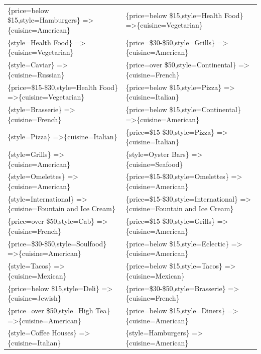 \documentclass[letterpaper,10pt]{article}
\begin{document}
\begin{appendices}
\begin{table}[h]
\begin{adjustbox}{max width=\textwidth}
\begin{tabular}{ll}
\{price=below \$15,style=Hamburgers\} =\textgreater \{cuisine=American\} & \{price=below \$15,style=Health Food\} =\textgreater \{cuisine=Vegetarian\} \\ 
\{style=Health Food\} =\textgreater \{cuisine=Vegetarian\} & \{price=\$30-\$50,style=Grills\} =\textgreater \{cuisine=American\} \\ 
\{style=Caviar\} =\textgreater \{cuisine=Russian\} & \{price=over \$50,style=Continental\} =\textgreater \{cuisine=French\} \\ 
\{price=\$15-\$30,style=Health Food\} =\textgreater \{cuisine=Vegetarian\} & \{price=below \$15,style=Pizza\} =\textgreater \{cuisine=Italian\} \\ 
\{style=Brasserie\} =\textgreater \{cuisine=French\} & \{price=below \$15,style=Continental\} =\textgreater \{cuisine=American\} \\ 
\{style=Pizza\} =\textgreater \{cuisine=Italian\} & \{price=\$15-\$30,style=Pizza\} =\textgreater \{cuisine=Italian\} \\ 
\{style=Grills\} =\textgreater \{cuisine=American\} & \{style=Oyster Bars\} =\textgreater \{cuisine=Seafood\} \\ 
\{style=Omelettes\} =\textgreater \{cuisine=American\} & \{price=\$15-\$30,style=Omelettes\} =\textgreater \{cuisine=American\} \\ 
\{style=International\} =\textgreater \{cuisine=Fountain and Ice Cream\} & \{price=\$15-\$30,style=International\} =\textgreater \{cuisine=Fountain and Ice Cream\} \\ 
\{price=over \$50,style=Cab\} =\textgreater \{cuisine=French\} & \{price=\$15-\$30,style=Grills\} =\textgreater \{cuisine=American\} \\ 
\{price=\$30-\$50,style=Soulfood\} =\textgreater \{cuisine=American\} & \{price=below \$15,style=Eclectic\} =\textgreater \{cuisine=American\} \\ 
\{style=Tacos\} =\textgreater \{cuisine=Mexican\} & \{price=below \$15,style=Tacos\} =\textgreater \{cuisine=Mexican\} \\ 
\{price=below \$15,style=Deli\} =\textgreater \{cuisine=Jewish\} & \{price=\$30-\$50,style=Brasserie\} =\textgreater \{cuisine=French\} \\ 
\{price=over \$50,style=High Tea\} =\textgreater \{cuisine=American\} & \{price=below \$15,style=Diners\} =\textgreater \{cuisine=American\} \\ 
\{style=Coffee Houses\} =\textgreater \{cuisine=Italian\} & \{style=Hamburgers\} =\textgreater \{cuisine=American\} \\ 

\end{tabular}
\end{adjustbox}
\end{table}
\end{appendices}
\end{document}
